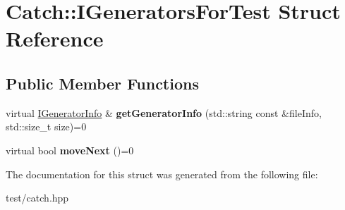 \hypertarget{structCatch_1_1IGeneratorsForTest}{}\section{Catch\+:\+:I\+Generators\+For\+Test Struct Reference}
\label{structCatch_1_1IGeneratorsForTest}
\subsection*{Public Member Functions}
\begin{DoxyCompactItemize}
\item 
virtual \hyperlink{structCatch_1_1IGeneratorInfo}{I\+Generator\+Info} \& {\bfseries get\+Generator\+Info} (std\+::string const \&file\+Info, std\+::size\+\_\+t size)=0\hypertarget{structCatch_1_1IGeneratorsForTest_a180d84e858840188e4c3788e47eefdb0}{}\label{structCatch_1_1IGeneratorsForTest_a180d84e858840188e4c3788e47eefdb0}

\item 
virtual bool {\bfseries move\+Next} ()=0\hypertarget{structCatch_1_1IGeneratorsForTest_adab31832d529fc584fd63164e0a1c8ad}{}\label{structCatch_1_1IGeneratorsForTest_adab31832d529fc584fd63164e0a1c8ad}

\end{DoxyCompactItemize}


The documentation for this struct was generated from the following file\+:\begin{DoxyCompactItemize}
\item 
test/catch.\+hpp\end{DoxyCompactItemize}

